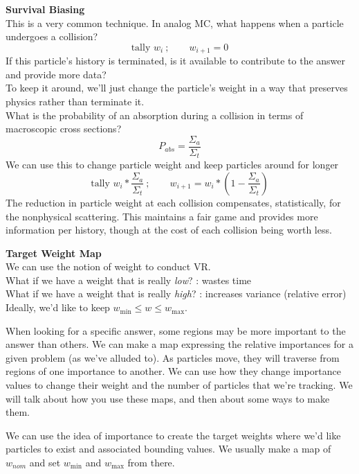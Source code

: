 \documentclass[12pt]{article}
\begin{document}
\textbf{Survival Biasing}\\
This is a very common technique. In analog MC, what happens when a particle undergoes a collision?
\[
\text{tally }w_i\:; \qquad  w_{i+1} = 0
\]
If this particle's history is terminated, is it available to contribute to the answer and provide more data?\\
To keep it around, we'll just change the particle's weight in a way that preserves physics rather than terminate it. \\
What is the probability of an absorption during a collision in terms of macroscopic cross sections?
\[
P_{abs} = \frac{\Sigma_a}{\Sigma_t}
\]
We can use this to change particle weight and keep particles around for longer
\[
\text{tally }w_i*\frac{\Sigma_a}{\Sigma_t}\:; \qquad w_{i+1} = w_i*(1 - \frac{\Sigma_a}{\Sigma_t})
\]
The reduction in particle weight at each collision compensates, statistically, for the nonphysical scattering. This maintains a fair game and provides more information per history, though at the cost of each collision being worth less.

\textbf{Target Weight Map}\\
We can use the notion of weight to conduct VR. \\
What if we have a weight that is really \textit{low}? : wastes time\\
What if we have a weight that is really \textit{high}? : increases variance (relative error)\\
Ideally, we'd like to keep $w_{\min} \leq w \leq w_{\max}$.

When looking for a specific answer, some regions may be more important to the answer than others. We can make a map expressing the relative importances for a given problem (as we've alluded to). As particles move, they will traverse from regions of one importance to another. We can use how they change importance values to change their weight and the number of particles that we're tracking. We will talk about how you use these maps, and then about some ways to make them.

We can use the idea of importance to create the target weights where we'd like particles to exist and associated bounding values. We usually make a map of $w_{nom}$ and set $w_{\min}$ and $w_{\max}$ from there. 

\end{document}
